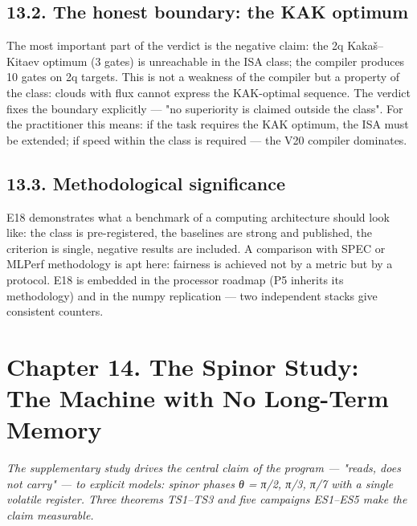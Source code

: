\documentclass[11pt,a4paper]{article}
\begin{document}
\begin{center}\end{center}

\subsection{13.2. The honest boundary: the KAK optimum}

The most important part of the verdict is the negative claim: the 2q Kakaš–Kitaev optimum (3 gates) is unreachable in the ISA class; the compiler produces 10 gates on 2q targets. This is not a weakness of the compiler but a property of the class: clouds with flux cannot express the KAK-optimal sequence. The verdict fixes the boundary explicitly — "no superiority is claimed outside the class". For the practitioner this means: if the task requires the KAK optimum, the ISA must be extended; if speed within the class is required — the V20 compiler dominates.

\subsection{13.3. Methodological significance}

E18 demonstrates what a benchmark of a computing architecture should look like: the class is pre-registered, the baselines are strong and published, the criterion is single, negative results are included. A comparison with SPEC or MLPerf methodology is apt here: fairness is achieved not by a metric but by a protocol. E18 is embedded in the processor roadmap (P5 inherits its methodology) and in the numpy replication — two independent stacks give consistent counters.

\section{Chapter 14. The Spinor Study: The Machine with No Long-Term Memory}

\noindent\textit{\color{copper}The supplementary study drives the central claim of the program — "reads, does not carry" — to explicit models: spinor phases θ = π/2, π/3, π/7 with a single volatile register. Three theorems TS1–TS3 and five campaigns ES1–ES5 make the claim measurable.}
\end{document}
